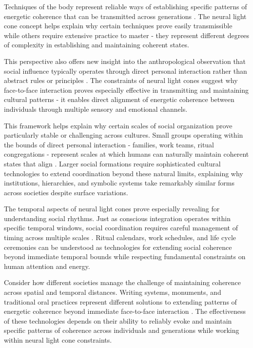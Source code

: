 \begin{refsection}
Techniques of the body represent reliable ways of establishing specific patterns of energetic coherence that can be transmitted across generations \cite{mauss1973techniques}. The neural light cone concept helps explain why certain techniques prove easily transmissible while others require extensive practice to master - they represent different degrees of complexity in establishing and maintaining coherent states.

This perspective also offers new insight into the anthropological observation that social influence typically operates through direct personal interaction rather than abstract rules or principles \cite{goffman1967interaction}. The constraints of neural light cones suggest why face-to-face interaction proves especially effective in transmitting and maintaining cultural patterns - it enables direct alignment of energetic coherence between individuals through multiple sensory and emotional channels.

This framework helps explain why certain scales of social organization prove particularly stable or challenging across cultures. Small groups operating within the bounds of direct personal interaction - families, work teams, ritual congregations - represent scales at which humans can naturally maintain coherent states that align \cite{hutchins1995cognition}. Larger social formations require sophisticated cultural technologies to extend coordination beyond these natural limits, explaining why institutions, hierarchies, and symbolic systems take remarkably similar forms across societies despite surface variations.

The temporal aspects of neural light cones prove especially revealing for understanding social rhythms. Just as conscious integration operates within specific temporal windows, social coordination requires careful management of timing across multiple scales \cite{mcneill1995keeping}. Ritual calendars, work schedules, and life cycle ceremonies can be understood as technologies for extending social coherence beyond immediate temporal bounds while respecting fundamental constraints on human attention and energy.

Consider how different societies manage the challenge of maintaining coherence across spatial and temporal distances. Writing systems, monuments, and traditional oral practices represent different solutions to extending patterns of energetic coherence beyond immediate face-to-face interaction \cite{thompson2001radical}. The effectiveness of these technologies depends on their ability to reliably evoke and maintain specific patterns of coherence across individuals and generations while working within neural light cone constraints.


\end{refsection}
